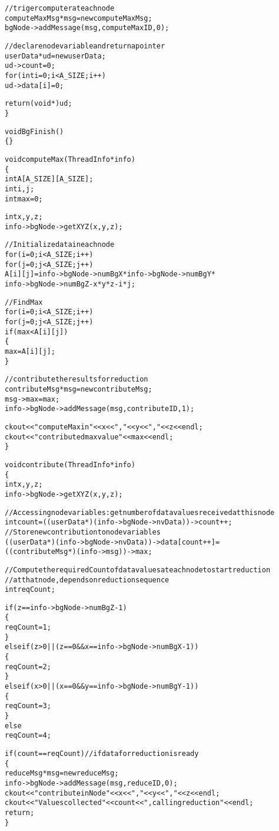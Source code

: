 \documentclass[10pt]{article}
\begin{document}
\begin{alltt}
  //triger computer at each node
  computeMaxMsg *msg = new computeMaxMsg;
  bgNode->addMessage(msg, computeMaxID, 0);

  //declare node variable and return a pointer
  userData *ud = new userData ;
  ud->count = 0 ;
  for(int i=0; i<A_SIZE; i++)
   ud->data[i] = 0 ;

  return (void*)ud ;
\}

void BgFinish()
\{\}

void computeMax(ThreadInfo *info)
\{
  int A[A_SIZE][A_SIZE];
  int i, j;
  int max = 0;

  int x,y,z;
  info->bgNode->getXYZ(x,y,z);

  // Initialize data in each node
  for (i=0;i<A_SIZE;i++)
    for (j=0;j<A_SIZE;j++)
      A[i][j] = info->bgNode->numBgX * info->bgNode->numBgY * 
                info->bgNode->numBgZ - x*y*z - i*j ;

  // Find Max
  for (i=0;i<A_SIZE;i++)
    for (j=0;j<A_SIZE;j++)
      if (max < A[i][j])
      \{
             max = A[i][j];
      \}

  // contribute the results for reduction
  contributeMsg *msg = new contributeMsg;
  msg->max = max;
  info->bgNode->addMessage(msg,contributeID,1);

  ckout << "computeMax in " << x << ", " << y << ", " << z << endl;
  ckout << "contributed max value " << max << endl;
\}

void contribute(ThreadInfo *info)
\{
  int x,y,z;
  info->bgNode->getXYZ(x,y,z);

  // Accessing node variables : get number of data values received at this node
  int count = ((userData*)(info->bgNode->nvData))->count++ ;
  // Store new contribution to node variables
  ((userData*)(info->bgNode->nvData))->data[count++] =
((contributeMsg*)(info->msg))->max ;

 // Compute the required Count of data values at each node to start reduction 
 // at that node, depends on reduction sequence
  int reqCount ;

  if(z==info->bgNode->numBgZ-1)
  \{
         reqCount = 1 ;
  \}
  else if(z>0 || (z==0 \&\& x==info->bgNode->numBgX-1))
  \{
         reqCount = 2 ;
  \}
  else if(x>0 || (x==0 \&\& y==info->bgNode->numBgY-1))
  \{
         reqCount = 3 ;
  \}
  else
         reqCount = 4 ;

  if(count==reqCount)     //if data for reduction is ready
  \{
       reduceMsg *msg = new reduceMsg ;
       info->bgNode->addMessage(msg, reduceID, 0) ;
       ckout << "contribute in Node " << x << ", " << y << ", " << z << endl;
       ckout << "Values collected " << count << ", calling reduction " << endl;
       return ;
  \}


\end{alltt}
\end{document}
